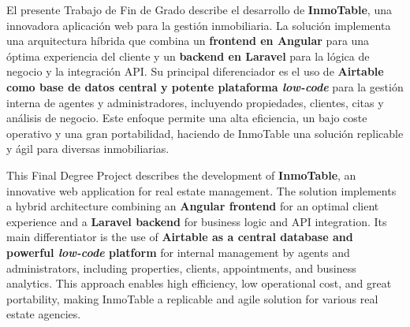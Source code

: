El presente Trabajo de Fin de Grado describe el desarrollo de \textbf{InmoTable}, una innovadora aplicación web para la gestión inmobiliaria. La solución implementa una arquitectura híbrida que combina un \textbf{frontend en Angular} para una óptima experiencia del cliente y un \textbf{backend en Laravel} para la lógica de negocio y la integración API. Su principal diferenciador es el uso de \textbf{Airtable como base de datos central y potente plataforma \textit{low-code}} para la gestión interna de agentes y administradores, incluyendo propiedades, clientes, citas y análisis de negocio. Este enfoque permite una alta eficiencia, un bajo coste operativo y una gran portabilidad, haciendo de InmoTable una solución replicable y ágil para diversas inmobiliarias.

\vspace{1.5cm}

This Final Degree Project describes the development of \textbf{InmoTable}, an innovative web application for real estate management. The solution implements a hybrid architecture combining an \textbf{Angular frontend} for an optimal client experience and a \textbf{Laravel backend} for business logic and API integration. Its main differentiator is the use of \textbf{Airtable as a central database and powerful \textit{low-code} platform} for internal management by agents and administrators, including properties, clients, appointments, and business analytics. This approach enables high efficiency, low operational cost, and great portability, making InmoTable a replicable and agile solution for various real estate agencies.